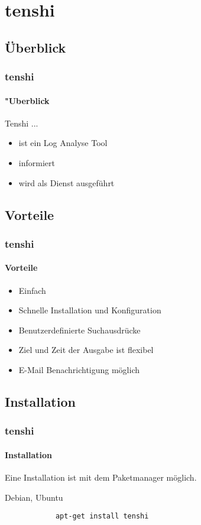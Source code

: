\section{tenshi}
\subsection{Überblick}
\begin{frame}[fragile]
	\frametitle{tenshi}
	\framesubtitle{"Uberblick}
	Tenshi ...
	\begin{itemize}
		\item ist ein Log Analyse Tool
		\item informiert
		\item wird als Dienst ausgeführt
	\end{itemize}
\end{frame}

\subsection{Vorteile}
\begin{frame}[fragile]
	\frametitle{tenshi}
	\framesubtitle{Vorteile}
	\begin{itemize}
		\item Einfach
		\item Schnelle Installation und Konfiguration
		\item Benutzerdefinierte Suchausdrücke
		\item Ziel und Zeit der Ausgabe ist flexibel
		\item E-Mail Benachrichtigung möglich
	\end{itemize}
\end{frame}

\subsection{Installation}
\begin{frame}[fragile]
	\frametitle{tenshi}
	\framesubtitle{Installation}
	Eine Installation ist mit dem Paketmanager möglich.
	\begin{block}{Debian, Ubuntu}
		\begin{verbatim}
			apt-get install tenshi
		\end{verbatim}
	\end{block}
\end{frame}

